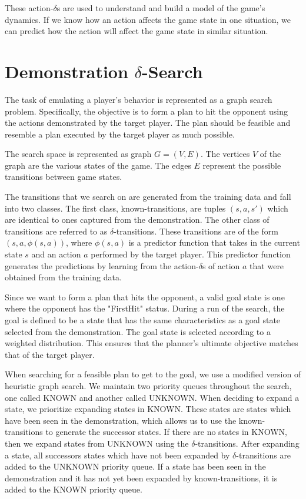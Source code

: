 These action-$\delta$s are used to understand and build a model of the game's dynamics. If we know how an action affects the game state in one situation, we can predict how the action will affect the game state in similar situation. 

\section{Demonstration $\delta$-Search}
The task of emulating a player's behavior is represented as a graph search problem. Specifically, the objective is to form a plan to hit the opponent using the actions demonstrated by the target player. The plan should be feasible and resemble a plan executed by the target player as much possible.

The search space is represented as graph $G = (V, E)$. The vertices $V$ of the graph are the various states of the game. The edges $E$ represent the possible transitions between game states. 

The transitions that we search on are generated from the training data and fall into two classes. The first class, known-transitions, are tuples $(s,a,s')$ which are identical to ones captured from the demonstration. The other class of transitions are referred to as $\delta$-transitions. These transitions are of the form $(s, a, \phi(s, a))$, where $\phi(s, a)$ is a predictor function that takes in the current state $s$ and an action $a$ performed by the target player. This predictor function generates the predictions by learning from the action-$\delta$s of action $a$ that were obtained from the training data.

Since we want to form a plan that hits the opponent, a valid goal state is one where the opponent has the "FirstHit" status. During a run of the search, the goal is defined to be a state that has the same characteristics as a goal state selected from the demonstration. The goal state is selected according to a weighted distribution. This ensures that the planner's ultimate objective matches that of the target player.

When searching for a feasible plan to get to the goal, we use a modified version of heuristic graph search. We maintain two priority queues throughout the search, one called KNOWN and another called UNKNOWN. When deciding to expand a state, we prioritize expanding states in KNOWN. These states are states which have been seen in the demonstration, which allows us to use the known-transitions to generate the successor states. If there are no states in KNOWN, then we expand states from UNKNOWN using the $\delta$-transitions. After expanding a state, all successors states which have not been expanded by $\delta$-transitions are added to the UNKNOWN priority queue. If a state has been seen in the demonstration and it has not yet been expanded by known-transitions, it is added to the KNOWN priority queue.

